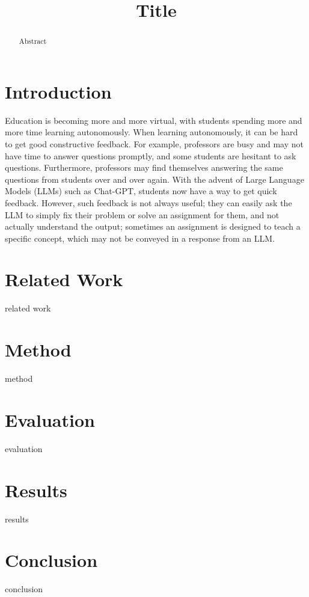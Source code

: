 \documentclass{article}
\title{Title}
\begin{document}
	\maketitle

    	\begin{abstract}
		Abstract
	\end{abstract}

	\section{Introduction}
		Education is becoming more and more virtual, with students spending more and more time learning autonomously. When learning autonomously, it can be hard to get good constructive feedback. For example, professors are busy and may not have time to answer questions promptly, and some students are hesitant to ask questions. Furthermore, professors may find themselves answering the same questions from students over and over again. With the advent of Large Language Models (LLMs) such as Chat-GPT, students now have a way to get quick feedback. However, such feedback is not always useful; they can easily ask the LLM to simply fix their problem or solve an assignment for them, and not actually understand the output; sometimes an assignment is designed to teach a specific concept, which may not be conveyed in a response from an LLM. 
	\section{Related Work}
		related work
	\section{Method}
		method
	\section{Evaluation}
		evaluation
	\section{Results}
		results
	\section{Conclusion}
		conclusion
\end{document}
